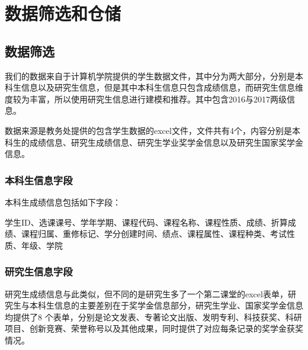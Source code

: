 %
%
%
%
%
%

\chapter{数据筛选和仓储}

\section{数据筛选}

我们的数据来自于计算机学院提供的学生数据文件，其中分为两大部分，分别是本科生信息以及研究生信息，但是其中本科生信息只包含成绩信息，而研究生信息维度较为丰富，所以使用研究生信息进行建模和推荐。其中包含2016与2017两级信息。

数据来源是教务处提供的包含学生数据的excel文件，文件共有4个，内容分别是本科生的成绩信息、研究生成绩信息、研究生学业奖学金信息以及研究生国家奖学金信息。

\subsection{本科生信息字段}

本科生成绩信息包括如下字段：

学生ID、选课课号、学年学期、课程代码、课程名称、课程性质、成绩、折算成绩、课程归属、重修标记、学分创建时间、绩点、课程属性、课程种类、考试性质、年级、学院

\subsection{研究生信息字段}

研究生成绩信息与此类似，但不同的是研究生多了一个第二课堂的excel表单，研究生与本科生信息的主要差别在于奖学金信息部分，研究生学业、国家奖学金信息均提供了8 个表单，分别是论文发表、专著论文出版、发明专利、科技获奖、科研项目、创新竞赛、荣誉称号以及其他成果，同时提供了对应每条记录的奖学金获奖情况。

